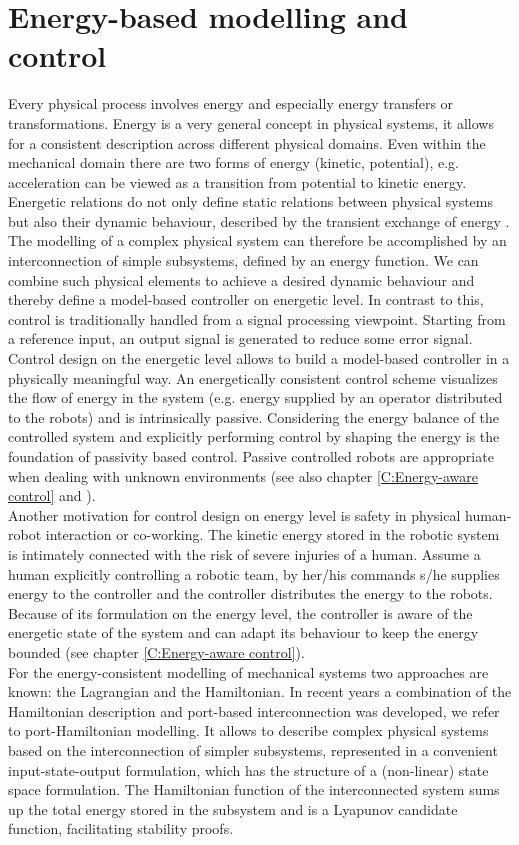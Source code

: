 \documentclass[a4paper,twoside, openright,12pt]{report}
\begin{document}
\section{Energy-based modelling and control}
Every physical process involves energy and especially energy transfers or transformations. Energy is a very general concept in physical systems, it allows for a consistent description across different physical domains. Even within the mechanical domain there are two forms of energy (kinetic, potential), e.g. acceleration can be viewed as a transition from potential to kinetic energy. Energetic relations do not only define static relations between physical systems but also their dynamic behaviour, described by the transient exchange of energy \cite{Ortega_01}. The modelling of a complex physical system can therefore be accomplished by an interconnection of simple subsystems, defined by an energy function. We can combine such physical elements to achieve a desired dynamic behaviour and thereby define a model-based controller on energetic level.  In contrast to this, control is traditionally handled from a signal processing viewpoint. Starting from a reference input, an output signal is generated to reduce some error signal. Control design on the energetic level allows to build a model-based controller in a physically meaningful way. An energetically consistent control scheme visualizes the flow of energy in the system (e.g. energy supplied by an operator distributed to the robots) and is intrinsically passive. Considering the energy balance of the controlled system and explicitly performing control by shaping the energy is the foundation of passivity based control. Passive controlled robots are appropriate when dealing with unknown environments (see also chapter \ref{C:Energy-aware control} and \cite{Stramigioli_15}).\\
Another motivation for control design on energy level is safety in physical human-robot interaction or co-working. The kinetic energy stored in the robotic system is intimately connected with the risk of severe injuries of a human. Assume a human explicitly controlling a robotic team, by her/his commands s/he supplies energy to the controller and the controller distributes the energy to the robots. Because of its formulation on the energy level, the controller is aware of the energetic state of the system and can adapt its behaviour to keep the energy bounded (see chapter \ref{C:Energy-aware control}).\\
For the energy-consistent modelling of mechanical systems two approaches are known:  the Lagrangian and the Hamiltonian. In recent years a combination of the Hamiltonian description and port-based interconnection was developed, we refer to port-Hamiltonian modelling. It allows to describe complex physical systems based on the interconnection of simpler subsystems, represented in a convenient input-state-output formulation, which has the structure of a (non-linear) state space formulation. The Hamiltonian function of the interconnected system sums up the total energy stored in the subsystem and is a Lyapunov candidate function, facilitating stability proofs.
\end{document}
